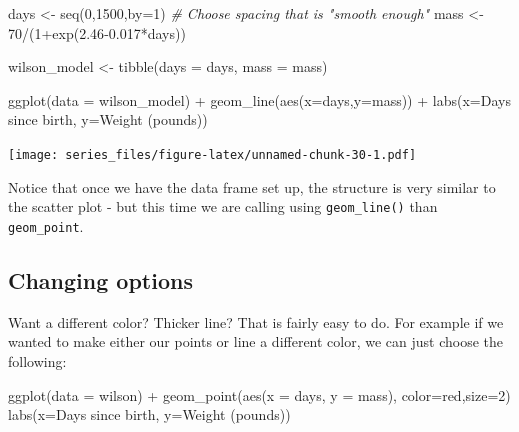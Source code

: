 \documentclass[
]{book}
\newenvironment{Shaded}{\begin{snugshade}}{\end{snugshade}}
\newcommand{\AttributeTok}[1]{\textcolor[rgb]{0.77,0.63,0.00}{#1}}
\newcommand{\CommentTok}[1]{\textcolor[rgb]{0.56,0.35,0.01}{\textit{#1}}}
\newcommand{\DecValTok}[1]{\textcolor[rgb]{0.00,0.00,0.81}{#1}}
\newcommand{\FloatTok}[1]{\textcolor[rgb]{0.00,0.00,0.81}{#1}}
\newcommand{\FunctionTok}[1]{\textcolor[rgb]{0.00,0.00,0.00}{#1}}
\newcommand{\NormalTok}[1]{#1}
\newcommand{\OtherTok}[1]{\textcolor[rgb]{0.56,0.35,0.01}{#1}}
\newcommand{\SpecialCharTok}[1]{\textcolor[rgb]{0.00,0.00,0.00}{#1}}
\newcommand{\StringTok}[1]{\textcolor[rgb]{0.31,0.60,0.02}{#1}}
\theoremstyle{definition}
\theoremstyle{definition}
\theoremstyle{definition}
\theoremstyle{remark}
\begin{document}
\begin{Shaded}
\begin{Highlighting}[]
\NormalTok{days }\OtherTok{\textless{}{-}} \FunctionTok{seq}\NormalTok{(}\DecValTok{0}\NormalTok{,}\DecValTok{1500}\NormalTok{,}\AttributeTok{by=}\DecValTok{1}\NormalTok{)  }\CommentTok{\# Choose spacing that is "smooth enough"}
\NormalTok{mass }\OtherTok{\textless{}{-}}  \DecValTok{70}\SpecialCharTok{/}\NormalTok{(}\DecValTok{1}\SpecialCharTok{+}\FunctionTok{exp}\NormalTok{(}\FloatTok{2.46{-}0.017}\SpecialCharTok{*}\NormalTok{days))}

\NormalTok{wilson\_model }\OtherTok{\textless{}{-}} \FunctionTok{tibble}\NormalTok{(}\AttributeTok{days =}\NormalTok{ days,}
                       \AttributeTok{mass =}\NormalTok{ mass)}

\FunctionTok{ggplot}\NormalTok{(}\AttributeTok{data =}\NormalTok{ wilson\_model) }\SpecialCharTok{+}
  \FunctionTok{geom\_line}\NormalTok{(}\FunctionTok{aes}\NormalTok{(}\AttributeTok{x=}\NormalTok{days,}\AttributeTok{y=}\NormalTok{mass)) }\SpecialCharTok{+} 
  \FunctionTok{labs}\NormalTok{(}\AttributeTok{x=}\StringTok{\textquotesingle{}Days since birth\textquotesingle{}}\NormalTok{,}
         \AttributeTok{y=}\StringTok{\textquotesingle{}Weight (pounds)\textquotesingle{}}\NormalTok{)}
\end{Highlighting}
\end{Shaded}

\texttt{[image: series\_files/figure-latex/unnamed-chunk-30-1.pdf]}

Notice that once we have the data frame set up, the structure is very similar to the scatter plot - but this time we are calling using \texttt{geom\_line()} than \texttt{geom\_point}.

\hypertarget{changing-options}{%
\subsection{Changing options}\label{changing-options}}

Want a different color? Thicker line? That is fairly easy to do. For example if we wanted to make either our points or line a different color, we can just choose the following:

\begin{Shaded}
\begin{Highlighting}[]
\FunctionTok{ggplot}\NormalTok{(}\AttributeTok{data =}\NormalTok{ wilson) }\SpecialCharTok{+} 
  \FunctionTok{geom\_point}\NormalTok{(}\FunctionTok{aes}\NormalTok{(}\AttributeTok{x =}\NormalTok{ days, }\AttributeTok{y =}\NormalTok{ mass), }\AttributeTok{color=}\StringTok{\textquotesingle{}red\textquotesingle{}}\NormalTok{,}\AttributeTok{size=}\DecValTok{2}\NormalTok{) }
  \FunctionTok{labs}\NormalTok{(}\AttributeTok{x=}\StringTok{\textquotesingle{}Days since birth\textquotesingle{}}\NormalTok{,}
         \AttributeTok{y=}\StringTok{\textquotesingle{}Weight (pounds)\textquotesingle{}}\NormalTok{)}
\end{Highlighting}
\end{Shaded}
\end{document}

